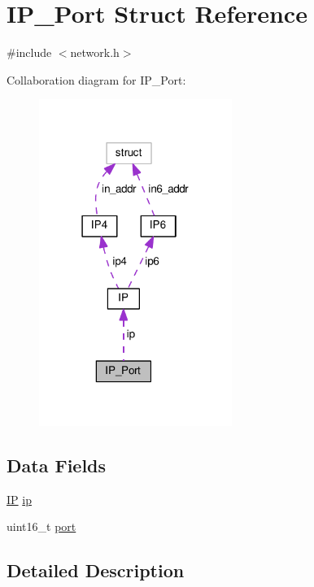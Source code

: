 \hypertarget{struct_i_p___port}{\section{I\+P\+\_\+\+Port Struct Reference}
\label{struct_i_p___port}
}


{\ttfamily \#include $<$network.\+h$>$}



Collaboration diagram for I\+P\+\_\+\+Port\+:
\nopagebreak
\begin{figure}[H]
\begin{center}
\leavevmode
\includegraphics[width=178pt]{d0/de8/struct_i_p___port__coll__graph}
\end{center}
\end{figure}
\subsection*{Data Fields}
\begin{DoxyCompactItemize}
\item 
\hyperlink{struct_i_p}{I\+P} \hyperlink{struct_i_p___port_a0c6193a337a223c63411b2fe722d79ec}{ip}
\item 
uint16\+\_\+t \hyperlink{struct_i_p___port_a8e0798404bf2cf5dabb84c5ba9a4f236}{port}
\end{DoxyCompactItemize}


\subsection{Detailed Description}


